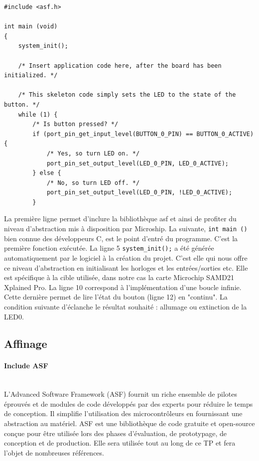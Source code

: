 \documentclass[a4paper]{article}
\begin{document}
\begin{lstlisting}[style=CStyle]
#include <asf.h>

int main (void)
{
	system_init();
	
	/* Insert application code here, after the board has been initialized. */
	
	/* This skeleton code simply sets the LED to the state of the button. */
	while (1) {
		/* Is button pressed? */
		if (port_pin_get_input_level(BUTTON_0_PIN) == BUTTON_0_ACTIVE) {
			/* Yes, so turn LED on. */
			port_pin_set_output_level(LED_0_PIN, LED_0_ACTIVE);
		} else {
			/* No, so turn LED off. */
			port_pin_set_output_level(LED_0_PIN, !LED_0_ACTIVE);
		}
	\end{lstlisting}
	La première ligne permet d'inclure la  bibliothèque asf et ainsi de profiter du niveau d'abstraction mis à disposition par Microship. La suivante, \texttt{int main ()} bien connue des développeurs C, est le point d'entré du programme. C'est la première fonction exécutée. La ligne 5 \texttt{system\_init();} a été générée automatiquement par le logiciel à la création du projet. C'est elle qui nous offre ce niveau d'abstraction en initialisant les horloges et les entrées/sorties etc. Elle est spécifique à la cible utilisée, dans notre cas la carte Microchip SAMD21 Xplained Pro. La ligne 10 correspond à l'implémentation d'une boucle infinie. Cette dernière permet de lire l'état du bouton (ligne 12) en "continu". La condition suivante d’éclanche le résultat souhaité : allumage ou extinction de la LED0.
	
	\subsection{Affinage}
	
	\paragraph{Include ASF}
	~~\\
	L'Advanced Software Framework (ASF) fournit un riche ensemble de pilotes éprouvés et de modules de code développés par des experts pour réduire le temps de conception. Il simplifie l'utilisation des microcontrôleurs en fournissant une abstraction au matériel. ASF est une bibliothèque de code gratuite et open-source conçue pour être utilisée lors des phases d'évaluation, de prototypage, de conception et de production. Elle sera utilisée tout au long de ce TP et fera l'objet de nombreuses références.
	
\end{document}
